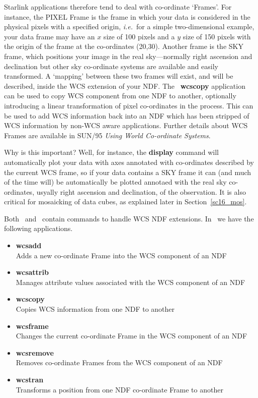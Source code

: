 \documentclass[twoside,11pt]{article}
\newcommand{\htmlref}[2]{#1}
\newcommand{\xref}[3]{#1}
\newcommand{\latex}[1]{#1}
\begin{document}
{Starlink applications therefore tend to deal with co-ordinate
`Frames'.  For instance, the PIXEL Frame is the frame in which your
data is considered in the physical pixels with a specified origin,
\emph{i.e.}\ for a simple two-dimensional example, your data frame may
have an $x$ size of 100 pixels and a $y$ size of 150 pixels with the
origin of the frame at the co-ordinates (20,30).  Another frame is the
SKY frame, which positions your image in the real sky---normally
right ascension and declination but other sky co-ordinate systems are
available and easily transformed.  A `mapping' between these two
frames will exist, and will be described, inside the WCS extension of
your NDF.  The \KAPPA\ \xref{{\bf wcscopy}}{sun95}{WCSCOPY} application can
be used to copy WCS component from one NDF to another, optionally
introducing a linear transformation of pixel co-ordinates in the
process.  This can be used to add WCS information back into an NDF
which has been stripped of WCS information by non-WCS aware
applications.  Further details about \xref{WCS Frames}{sun95}{se_resdoms} 
are available \latex{in SUN/95 {\em Using World Co-ordinate
Systems}}.

Why is this important?  Well, for instance, the
\xref{{\bf display}}{sun95}{DISPLAY} command will automatically plot your
data with axes annotated with co-ordinates described by the current
WCS frame, so if your data contains a SKY frame it can (and much of
the time will) be automatically be plotted annotaed with the real sky
co-ordinates, usyally right ascension and declination, of the
observation.  It is also critical for mosaicking of data cubes, as
explained \htmlref{later}{sc16_mos}\latex{ in Section~\ref{sc16_mos}}.

Both \KAPPAref\ and \CCDPACKref\ contain commands to handle WCS NDF
extensions.  In \KAPPA\ we have the following applications.

\begin{itemize}  
\item{\xref{{\bf wcsadd}}{sun95}{WCSADD}}\\
Adds a new co-ordinate Frame into the WCS component of an NDF 
\item{\xref{{\bf wcsattrib}}{sun95}{WCSATTRIB}}\\
Manages attribute values associated with the WCS component of an NDF
\item{\xref{{\bf wcscopy}}{sun95}{WCSCOPY}}\\ 
Copies WCS information from one NDF to another 
\item{\xref{{\bf wcsframe}}{sun95}{WCSFRAME}}\\ 
Changes the current co-ordinate Frame in the WCS component of an NDF 
\item{\xref{{\bf wcsremove}}{sun95}{WCSREMOVE}}\\
Removes co-ordinate Frames from the WCS component of an NDF 
\item{\xref{{\bf wcstran}}{sun95}{WCSTRAN}}\\
Transforms a position from one NDF co-ordinate Frame to another 
\end{itemize}

}
\end{document}
